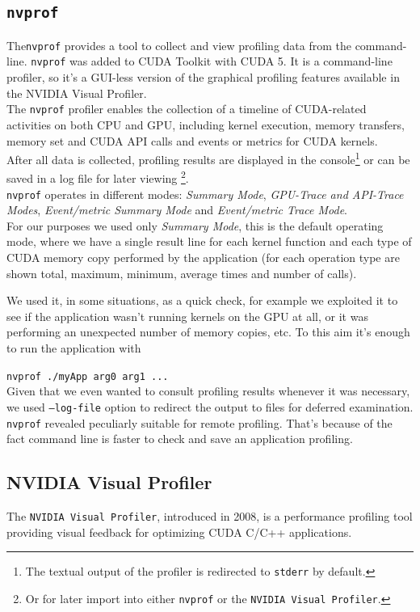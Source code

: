 	\subsection{\texttt{nvprof}}
	The\texttt{nvprof} provides a tool to collect and view profiling data from the command-line.
	\texttt{nvprof} was added to CUDA Toolkit with CUDA 5. It is a command-line profiler, so it's a GUI-less version of the graphical profiling features available in the NVIDIA Visual Profiler.\\
	The \texttt{nvprof} profiler enables the collection of a timeline of CUDA-related activities on both CPU and GPU, including kernel execution, memory transfers, memory set and CUDA API calls and events or metrics for CUDA kernels.\\
	After all data is collected, profiling results are displayed in the console\footnote{The textual output of the profiler is redirected to \texttt{stderr} by default.} or can be saved in a log file for later viewing \footnote{Or for later import into either \texttt{nvprof} or the \texttt{NVIDIA Visual Profiler}.}.\\
	\texttt{nvprof} operates in different modes: \textit{Summary Mode}, \textit{GPU-Trace and API-Trace Modes}, \textit{Event/metric Summary Mode} and  \textit{Event/metric Trace Mode}\cite{profilersguide, nvprofarticle}.\\	
	For our purposes we used only \textit{Summary Mode}, this is the default operating mode, where we have a single result line for each kernel function and each type of CUDA memory copy performed by the application (for each operation type are shown total, maximum, minimum, average times and number of calls)\cite{profilersguide}.
	
	We used it, in some situations, as a quick check, for example we exploited it to see if the application wasn't running kernels on the GPU at all, or it was performing an unexpected number of memory copies, etc.
	To this aim it's enough to run the application with
	
	\texttt{nvprof ./myApp arg0 arg1 ...}\\
	Given that we even wanted to consult profiling results whenever it was necessary, we used \texttt{--log-file} option to redirect the output to files for deferred examination. \\
	\texttt{nvprof} revealed peculiarly suitable for remote profiling. That's because of the fact command line is faster to check and save an application profiling.
	  
	\subsection{NVIDIA Visual Profiler}
	The \texttt{NVIDIA Visual Profiler}, introduced in 2008, is a performance profiling tool providing visual feedback for optimizing CUDA C/C++ applications.
	
